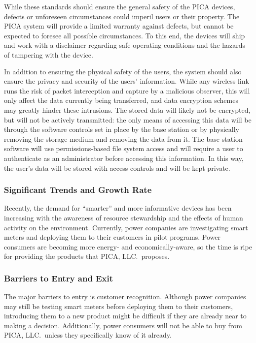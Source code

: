While these standards should ensure the general safety of the PICA devices, defects or unforeseen circumstances could imperil users or their property. The PICA system will provide a limited warranty against defects, but cannot be expected to foresee all possible circumstances. To this end, the devices will ship and work with a disclaimer regarding safe operating conditions and the hazards of tampering with the device.

In addition to ensuring the physical safety of the users, the system should also ensure the privacy and security of the users' information. While any wireless link runs the risk of packet interception and capture by a malicious observer, this will only affect the data currently being transferred, and data encryption schemes may greatly hinder these intrusions. The stored data will likely not be encrypted, but will not be actively transmitted: the only means of accessing this data will be through the software controls set in place by the base station or by physically removing the storage medium and removing the data from it. The base station software will use permissions-based file system access and will require a user to authenticate as an administrator before accessing this information. In this way, the user's data will be stored with access controls and will be kept private.

\subsubsection{Significant Trends and Growth Rate}
Recently, the demand for ``smarter'' and more informative devices has been increasing with the awareness of resource stewardship and the effects of human activity on the environment. Currently, power companies are investigating smart meters and deploying them to their customers in pilot programs. Power consumers are becoming more energy- and economically-aware, so the time is ripe for providing the products that PICA, LLC.\ proposes.

\subsubsection{Barriers to Entry and Exit}
The major barriers to entry is customer recognition. Although power companies may still be testing smart meters before deploying them to their customers, introducing them to a new product might be difficult if they are already near to making a decision. Additionally, power consumers will not be able to buy from PICA, LLC.\ unless they specifically know of it already.




